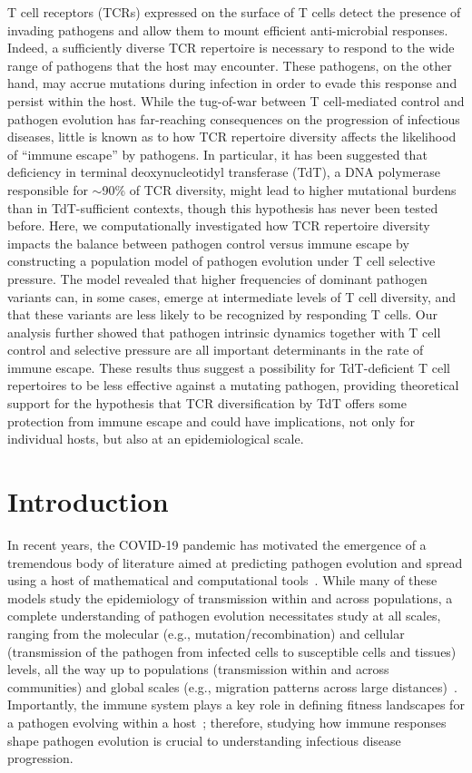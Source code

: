 T cell receptors (TCRs) expressed on the surface of T cells detect the presence of invading pathogens and allow them to mount efficient anti-microbial responses. Indeed, a sufficiently diverse TCR repertoire is necessary to respond to the wide range of pathogens that the host may encounter. These pathogens, on the other hand, may accrue mutations during infection in order to evade this response and persist within the host. While the tug-of-war between T cell-mediated control and pathogen evolution has far-reaching consequences on the progression of infectious diseases, little is known as to how TCR repertoire diversity affects the likelihood of “immune escape” by pathogens. In particular, it has been suggested that deficiency in terminal deoxynucleotidyl transferase (TdT), a DNA polymerase responsible for $\sim$90\% of TCR diversity, might lead to higher mutational burdens than in TdT-sufficient contexts, though this hypothesis has never been tested before. Here, we computationally investigated how TCR repertoire diversity impacts the balance between pathogen control versus immune escape by constructing a population model of pathogen evolution under T cell selective pressure. The model revealed that higher frequencies of dominant pathogen variants can, in some cases, emerge at intermediate levels of T cell diversity, and that these variants are less likely to be recognized by responding T cells. Our analysis further showed that pathogen intrinsic dynamics together with T cell control and selective pressure are all important determinants in the rate of immune escape. These results thus suggest a possibility for TdT-deficient T cell repertoires to be less effective against a mutating pathogen, providing theoretical support for the hypothesis that TCR diversification by TdT offers some protection from immune escape and could have implications, not only for individual hosts, but also at an epidemiological scale. 

\section{Introduction}

In recent years, the COVID-19 pandemic has motivated the emergence of a tremendous body of literature aimed at predicting pathogen evolution and spread using a host of mathematical and computational tools~\cite{saleem2022machine, rahimi2021review}. While many of these models study the epidemiology of transmission within and across populations, a complete understanding of pathogen evolution necessitates study at all scales, ranging from the molecular (e.g., mutation/recombination) and cellular (transmission of the pathogen from infected cells to susceptible cells and tissues) levels, all the way up to populations (transmission within and across communities) and global scales (e.g., migration patterns across large distances)~\cite{saad2022immuno}. Importantly, the immune system plays a key role in defining fitness landscapes for a pathogen evolving within a host~\cite{saad2022immuno,tenthorey2022evolutionary,moulana2023genotype}; therefore, studying how immune responses shape pathogen evolution is crucial to understanding infectious disease progression.

